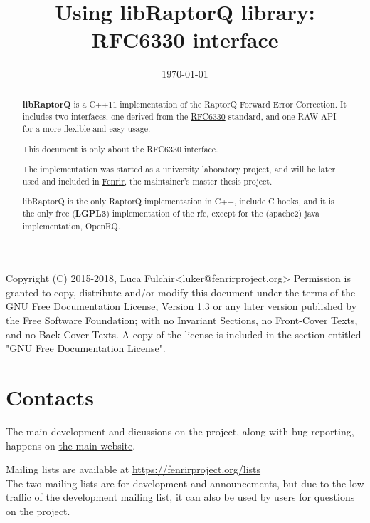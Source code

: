 \documentclass[11pt,a4paper]{refart}
\title{Using libRaptorQ library: RFC6330 interface}
\date{\today}
\begin{document}
\maketitle

\begin{abstract}

\textbf{libRaptorQ} is a C++11 implementation of the RaptorQ Forward Error Correction. It includes two interfaces, one derived from the \href{https://tools.ietf.org/html/rfc6330}{RFC6330} standard, and one RAW API for a more flexible and easy usage.

This document is only about the RFC6330 interface.

The implementation was started as a university laboratory project, and will be later used and included in \href{https://www.fenrirproject.org}{Fenrir}, the
maintainer's master thesis project.


libRaptorQ is the only RaptorQ implementation in C++, include C hooks, and it is the only free (\textbf{LGPL3}) implementation of the rfc, except for the (apache2)
java implementation, OpenRQ.
\end{abstract}

\vfill\hfill
\begin{verbbox}[\tiny]
Copyright (C)  2015-2018, Luca Fulchir<luker@fenrirproject.org>
Permission is granted to copy, distribute and/or modify this document
under the terms of the GNU Free Documentation License, Version 1.3
or any later version published by the Free Software Foundation;
with no Invariant Sections, no Front-Cover Texts, and no Back-Cover Texts.
A copy of the license is included in the section entitled "GNU
Free Documentation License".
\end{verbbox}
\theverbbox

\newpage
\tableofcontents
\newpage


\section{Contacts}

The main development and dicussions on the project, along with bug reporting, happens on
\href{https://fenrirproject.org/Luker/libRaptorQ}{the main website}.

 Mailing lists are available at \href{https://fenrirproject.org/lists}{https://fenrirproject.org/lists}\\
The two mailing lists are for development and announcements, but due to the low traffic of the development mailing list, it
can also be used by users for questions on the project.
\end{document}
